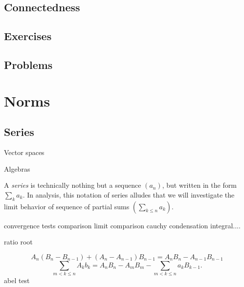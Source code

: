 \documentclass{../../large}
\begin{document}
\section{Connectedness}



\section*{Exercises}
\section*{Problems}








\chapter{Norms}




\section{Series}


\begin{prb}
Vector spaces
\end{prb}

\begin{prb}
Algebras
\end{prb}

A \emph{series} is technically nothing but a sequence $(a_n)$, but written in the form $\sum_ka_k$.
In analysis, this notation of series alludes that we will investigate the limit behavior of sequence of partial sums $(\sum_{k\le n}a_k)$.


convergence tests
comparison
limit comparison
cauchy condensation
integral....

ratio
root


\begin{prb}
\end{prb}



\begin{prb}
\[A_n(B_n-B_{n-1})+(A_n-A_{n-1})B_{n-1}=A_nB_n-A_{n-1}B_{n-1}\]
\[\sum_{m<k\le n}A_kb_k=A_nB_n-A_mB_m-\sum_{m<k\le n}a_kB_{k-1}.\]
abel test
\end{prb}
\end{document}
